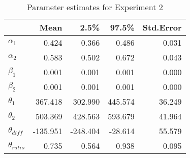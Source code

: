 \begin{table}[ht]
\centering
\begin{tabular}{lrrrr}
  \hline
 & Mean & 2.5\% & 97.5\% & Std.Error \\ 
  \hline
  $\alpha_1$ & 0.424 & 0.366 & 0.486 & 0.031 \\ 
  $\alpha_2$ & 0.583 & 0.502 & 0.672 & 0.043 \\ 
  $\beta_1$ & 0.001 & 0.001 & 0.001 & 0.000 \\ 
  $\beta_2$ & 0.001 & 0.001 & 0.001 & 0.000 \\ 
  $\theta_1$ & 367.418 & 302.990 & 445.574 & 36.249 \\ 
  $\theta_2$ & 503.369 & 428.563 & 593.679 & 41.964 \\ 
  $\theta_{diff}$ & -135.951 & -248.404 & -28.614 & 55.579 \\ 
  $\theta_{ratio}$ & 0.735 & 0.564 & 0.938 & 0.095 \\ 
   \hline
\end{tabular}
\caption{Parameter estimates for Experiment 2} 
\label{tab:res2}
\end{table}

